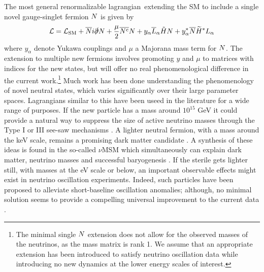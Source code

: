 \documentclass[11pt, a4paper]{article}
\def\lagrangian{lagrangian}
\def\ster{\ensuremath N}
\begin{document}
The most general renormalizable \lagrangian\ extending the SM to include a
single novel gauge-singlet fermion $\ster$ is given by
%
\begin{align}   \mathcal{L} = \mathcal{L}_\text{SM} +
\overline{\ster}i\slashed{\partial}\ster+ \frac{\mu}{2}
\overline{\ster^\text{c}}\ster  + y_\alpha\overline{L}_\alpha\tilde{H} \ster +
y_\alpha^* \overline{\ster}\widetilde{H}^*L_\alpha\label{eq:minimallag}
\end{align}
%
where $y_\alpha$ denote Yukawa couplings and $\mu$ a Majorana mass term for
$\ster$. The extension to multiple new fermions involves promoting $y$ and
$\mu$ to matrices with indices for the new states, but will offer no real
phenomenological difference in the current work.\footnote{The minimal single
$\ster$ extension does not allow for the observed masses of the neutrinos, as
the mass matrix is rank 1. We assume that an appropriate extension has been
introduced to satisfy neutrino oscillation data while introducing no new
dynamics at the lower energy scales of interest.} Much work has been done
understanding the phenomenology of novel neutral states, which varies
significantly over their large parameter spaces. 
%
Lagrangians similar to this have been useed in the literature for a wide range
of purposes. If the new particle has a mass around $10^{15}$ GeV it could
provide a natural way to suppress the size of active neutrino masses through
the Type I or III see-saw mechanisms \cite{Minkowski:1977sc, GellMann:1980vs,
Mohapatra:1979ia}. A lighter neutral fermion, with a mass around the keV scale,
remains a promising dark matter candidate \cite{Adhikari:2016bei}. A synthesis
of these ideas is found in the so-called $\nu$MSM which simultaneously can
explain dark matter, neutrino masses and successful baryogenesis
\cite{Asaka:2005pn}. 
%
If the sterile gets lighter still, with masses at the eV scale or below, an
important observable effects might exist in neutrino oscillation experiments.
Indeed, such particles have been proposed to alleviate short-baseline
oscillation anomalies; although, no minimal solution seems to provide a
compelling universal improvement to the current data \cite{Kopp:2013vaa,Conrad:2012qt}.
\end{document}
